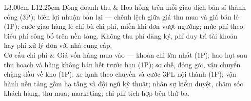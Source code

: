\begin{longtable}{L{3.00cm} L{12.25cm}}
Dòng doanh thu & Hoa hồng trên mỗi giao dịch bán sỉ thành công (3P); biên lợi nhuận bán lại --- chênh lệch giữa giá thu mua và giá bán lẻ (1P); cước giao hàng lẻ chỉ bù chi phí, miễn khi đơn vượt ngưỡng; mức phí theo biểu phí công bố trên nền tảng. Không thu phí đăng ký, phí duy trì tài khoản hay phí xử lý đơn với nhà cung cấp. \\
Cơ cấu chi phí & Giá vốn hàng mua vào --- khoản chi lớn nhất (1P); hao hụt sau thu hoạch và hàng không bán hết trước hạn (1P); sơ chế, đóng gói, vận chuyển chặng đầu về kho (1P); xe lạnh theo chuyến và cước 3PL nội thành (1P); vận hành nền tảng gồm hạ tầng và đội ngũ kỹ thuật; nhân sự kiểm duyệt, chăm sóc khách hàng, thu mua; marketing; chi phí tích hợp bên thứ ba. \\
\end{longtable}
\endgroup















\clearpage


\clearpage


\clearpage

